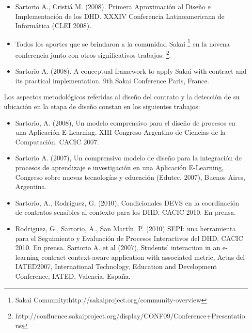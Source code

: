 \begin{itemize}
\item
Sartorio A., Cristiá M. (2008). Primera Aproximación al Diseño e Implementación
de los DHD.   XXXIV Conferencia Latinoamericana de Informática (CLEI 2008).

\item
Todos los aportes que se brindaron a la comunidad Sakai
\footnote{Sakai Comunnity:http://sakaiproject.org/community-overview} en la
novena conferencia junto con otros significativos trabajos: \footnote{
http://confluence.sakaiproject.org/display/CONF09/Conference+Presentations}. 

\item
Sartorio A. (2008). A conceptual framework  to apply Sakai with contract
and its practical implementation. 9th Sakai Conference Paris, France.

\end{itemize}



Los aspectos metodológicos referidas al diseño del contrato y la
detección de su ubicación en la etapa de diseño constan en los
siguientes trabajos:

\begin{itemize}
 
\item 
Sartorio, A. (2008), Un modelo comprensivo para el diseño de procesos en
una Aplicación E-Learning. XIII Congreso Argentino de Ciencias de la
Computación. CACIC 2007.

\item 
Sartorio A. (2007), Un comprensivo modelo de diseño para la integración
de procesos de aprendizaje e investigación en una Aplicación E-Learning,
Congreso sobre nuevas tecnologías y educación (Edutec, 2007), Buenos Aires, 
Argentina.

\end{itemize}


\begin{itemize}

Para el capítulo \ref{cap1.implementaciones} se utilizaron los avances sobre
el uso de métricas y tipos de condicionales a partir de las siguientes
publicaciones: 

\item  
Sartorio, A., Rodriguez, G. (2010), Condicionales DEVS en la coordinación de
contratos sensibles al contexto para los DHD. CACIC 2010. En prensa.

\item 
Rodriguez, G., Sartorio, A., San Martín, P. (2010) SEPI: una herramienta para el Seguimiento y Evaluación de Procesos Interactivos del DHD. CACIC 2010. En prensa.
Sartorio A. et al (2007), Students' interaction in an e-learning contract
context-aware application with associated metric, Actas del IATED2007,
International Technology, Education and Development Conference, IATED, Valencia,
España.

\end{itemize}

